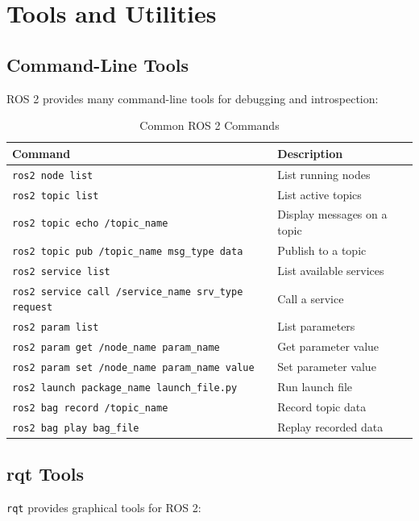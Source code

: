 \documentclass[a4paper,12pt]{book}
\newcommand{\code}[1]{\texttt{#1}}
\begin{document}
\chapter{Tools and Utilities}

\section{Command-Line Tools}

ROS 2 provides many command-line tools for debugging and introspection:

\begin{table}[H]
\centering
\begin{tabular}{|l|p{8cm}|}
\hline
\textbf{Command} & \textbf{Description} \\
\hline
\code{ros2 node list} & List running nodes \\
\hline
\code{ros2 topic list} & List active topics \\
\hline
\code{ros2 topic echo /topic\_name} & Display messages on a topic \\
\hline
\code{ros2 topic pub /topic\_name msg\_type data} & Publish to a topic \\
\hline
\code{ros2 service list} & List available services \\
\hline
\code{ros2 service call /service\_name srv\_type request} & Call a service \\
\hline
\code{ros2 param list} & List parameters \\
\hline
\code{ros2 param get /node\_name param\_name} & Get parameter value \\
\hline
\code{ros2 param set /node\_name param\_name value} & Set parameter value \\
\hline
\code{ros2 launch package\_name launch\_file.py} & Run launch file \\
\hline
\code{ros2 bag record /topic\_name} & Record topic data \\
\hline
\code{ros2 bag play bag\_file} & Replay recorded data \\
\hline
\end{tabular}
\caption{Common ROS 2 Commands}
\label{tab:ros2_commands}
\end{table}

\section{rqt Tools}

\code{rqt} provides graphical tools for ROS 2:
\end{document}
